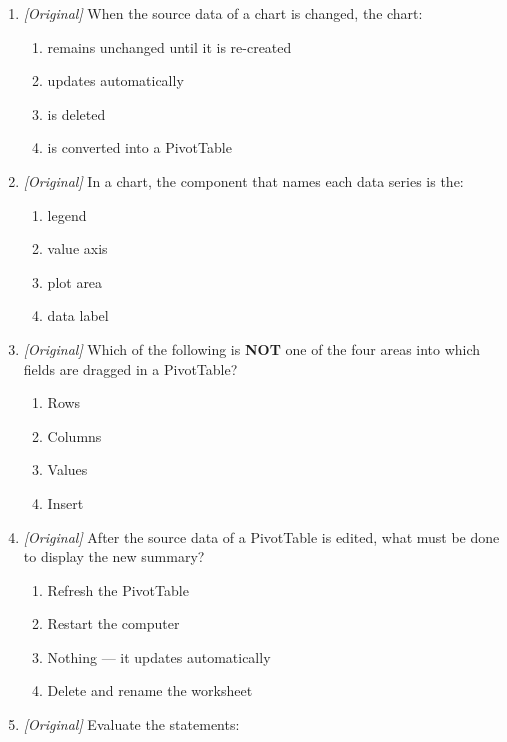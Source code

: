 \documentclass[11pt]{article}
\begin{document}
\begin{enumerate}[label=\textbf{Q\arabic*.}, leftmargin=*]
\begin{enumerate}[label=\Alph*.]
    \item Line chart
    \item Scatter (XY) chart
    \item Pie chart
    \item Column chart
  \end{enumerate}
\item \textit{[Original]} When the source data of a chart is changed, the chart:
  \begin{enumerate}[label=\Alph*.]
    \item remains unchanged until it is re-created
    \item updates automatically
    \item is deleted
    \item is converted into a PivotTable
  \end{enumerate}
\item \textit{[Original]} In a chart, the component that names each data series
  is the:
  \begin{enumerate}[label=\Alph*.]
    \item legend
    \item value axis
    \item plot area
    \item data label
  \end{enumerate}
\item \textit{[Original]} Which of the following is \textbf{NOT} one of the four
  areas into which fields are dragged in a PivotTable?
  \begin{enumerate}[label=\Alph*.]
    \item Rows
    \item Columns
    \item Values
    \item Insert
  \end{enumerate}
\item \textit{[Original]} After the source data of a PivotTable is edited, what
  must be done to display the new summary?
  \begin{enumerate}[label=\Alph*.]
    \item Refresh the PivotTable
    \item Restart the computer
    \item Nothing --- it updates automatically
    \item Delete and rename the worksheet
  \end{enumerate}
\item \textit{[Original]} Evaluate the statements:

\end{enumerate}
\end{document}
